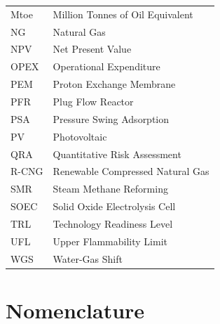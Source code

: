 \documentclass[12pt,twoside,openany]{book}
\begin{document}
\begin{longtable}{L{4cm} L{10cm}}
Mtoe & Million Tonnes of Oil Equivalent \\
NG & Natural Gas \\
NPV & Net Present Value \\
OPEX & Operational Expenditure \\
PEM & Proton Exchange Membrane \\
PFR & Plug Flow Reactor \\
PSA & Pressure Swing Adsorption \\
PV & Photovoltaic \\
QRA & Quantitative Risk Assessment \\
R-CNG & Renewable Compressed Natural Gas \\
SMR & Steam Methane Reforming \\
SOEC & Solid Oxide Electrolysis Cell \\
TRL & Technology Readiness Level \\
UFL & Upper Flammability Limit \\
WGS & Water-Gas Shift \\
\hline
\end{longtable}

\section*{Nomenclature}
\end{document}

